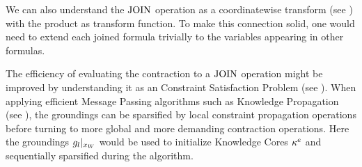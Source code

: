 We can also understand the $\mathrm{JOIN}$ operation as a coordinatewise transform (see ) with the product as transform function.
To make this connection solid, one would need to extend each joined formula trivially to the variables appearing in other formulas.

The efficiency of evaluating the contraction to a $\mathrm{JOIN}$ operation might be improved by understanding it as an Constraint Satisfaction Problem (see ).
When applying efficient Message Passing algorithms such as Knowledge Propagation (see ), the groundings can be sparsified by local constraint propagation operations before turning to more global and more demanding contraction operations.
Here the groundings ${g_{l}}|_{x_{W}}$ would be used to initialize Knowledge Cores $\kappa^{e}$ and sequentially sparsified during the algorithm.









